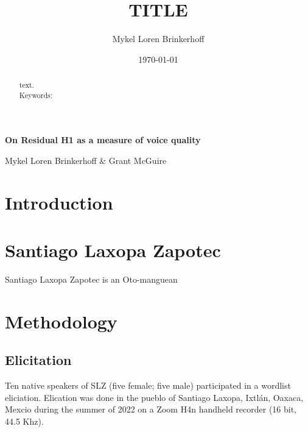 \documentclass[12pt, letterpaper]{article}
\title{TITLE}
\author{Mykel Loren Brinkerhoff}
\date{\today}
\begin{document}

	\onehalfspacing

\begin{center}
     {\Large \textbf{On Residual H1 as a measure of voice quality}}
     \vspace{6pt}

     Mykel Loren Brinkerhoff \& Grant McGuire
\end{center}
\thispagestyle{fancy}


\begin{abstract}
    text.
    \\
    Keywords:
\end{abstract}

\section{Introduction} \label{sec:Introduction}


\section{Santiago Laxopa Zapotec} \label{sec:SLZ}

Santiago Laxopa Zapotec is an Oto-manguean 

\section{Methodology} \label{sec:Methods}

\subsection{Elicitation} \label{sec:Elicitation}
Ten native speakers of SLZ (five female; five male) participated in a wordlist eliciation. Elication was done in the pueblo of Santiago Laxopa, Ixtlán, Oaxaca, Mexcio during the summer of 2022 on a Zoom H4n handheld recorder (16 bit, 44.5 Khz). 
\end{document}
